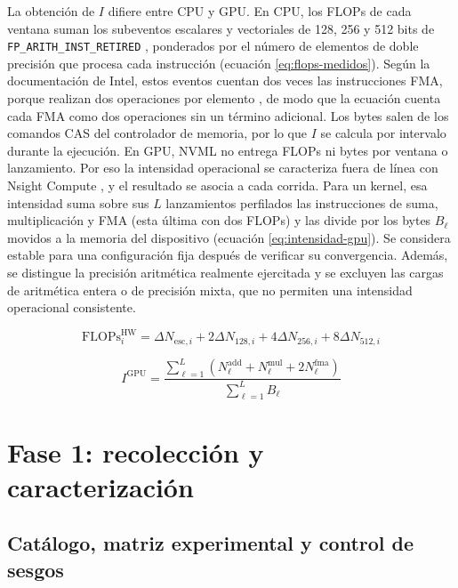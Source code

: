 La obtención de $I$ difiere entre CPU y GPU. En CPU, los FLOPs de cada ventana suman los subeventos escalares y vectoriales de 128, 256 y 512 bits de \texttt{FP\_ARITH\_INST\_RETIRED} \cite{IntelPerfmon2026}, ponderados por el número de elementos de doble precisión que procesa cada instrucción (ecuación \eqref{eq:flops-medidos}). Según la documentación de Intel, estos eventos cuentan dos veces las instrucciones FMA, porque realizan dos operaciones por elemento \cite{IntelPerfmon2026}, de modo que la ecuación cuenta cada FMA como dos operaciones sin un término adicional. Los bytes salen de los comandos CAS del controlador de memoria, por lo que $I$ se calcula por intervalo durante la ejecución. En GPU, NVML no entrega FLOPs ni bytes por ventana o lanzamiento. Por eso la intensidad operacional se caracteriza fuera de línea con Nsight Compute \cite{Nsight2026}, y el resultado se asocia a cada corrida. Para un kernel, esa intensidad suma sobre sus $L$ lanzamientos perfilados las instrucciones de suma, multiplicación y FMA (esta última con dos FLOPs) y las divide por los bytes $B_\ell$ movidos a la memoria del dispositivo (ecuación \eqref{eq:intensidad-gpu}). Se considera estable para una configuración fija después de verificar su convergencia. Además, se distingue la precisión aritmética realmente ejercitada y se excluyen las cargas de aritmética entera o de precisión mixta, que no permiten una intensidad operacional consistente.

\begin{equation}
\mathrm{FLOPs}_{i}^{\mathrm{HW}} =
\Delta N_{\mathrm{esc},i}+2\Delta N_{128,i}+4\Delta N_{256,i}+8\Delta N_{512,i}
\label{eq:flops-medidos}
\end{equation}

\begin{equation}
I^{\mathrm{GPU}} =
\frac{\sum_{\ell=1}^{L}(N^{\mathrm{add}}_{\ell}+N^{\mathrm{mul}}_{\ell}+2N^{\mathrm{fma}}_{\ell})}{\sum_{\ell=1}^{L}B_{\ell}}
\label{eq:intensidad-gpu}
\end{equation}


\section{Fase 1: recolección y caracterización}
\label{sec:met-fase1}

\subsection{Catálogo, matriz experimental y control de sesgos}
\label{sec:met-catalogo}

